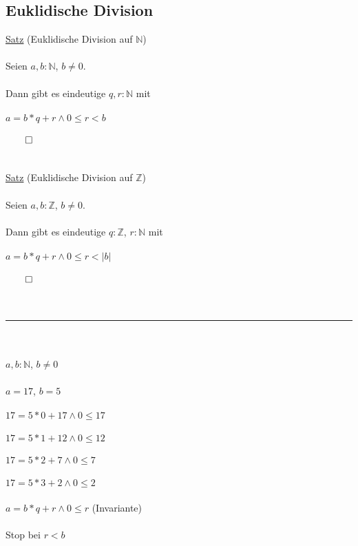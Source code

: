 \documentclass[18pt,a4paper]{article}
\begin{document}
\subsection{Euklidische Division}

\uline{Satz} (Euklidische Division auf $\mathbb{N}$)\\
\\
Seien $a,b : \mathbb{N} $, $ b\neq 0$.\\
\\
Dann gibt es eindeutige $q, r : \mathbb{N}$ mit\\
\\
$a = b*q + r \wedge 0\leqslant r < b$\\
\\
$\qed$\\
\\
\\
\uline{Satz} (Euklidische Division auf $\mathbb{Z}$)\\
\\
Seien $a,b : \mathbb{Z} $, $ b\neq 0$.\\
\\
Dann gibt es eindeutige $q : \mathbb{Z}$, $ r : \mathbb{N}$ mit\\
\\
$a = b*q + r \wedge 0\leqslant r < |b|$\\
\\
$\qed$\\
\\
\\
\rule{\textwidth}{0.4mm}\\
\\
$a,b : \mathbb{N}$, $b\neq 0$\\
\\
$a = 17$, $b = 5$\\
\\
$17 = 5*0 + 17 \wedge 0\leqslant 17$\\
\\
$17 = 5*1 + 12 \wedge 0\leqslant 12$\\
\\
$17 = 5*2 + 7 \wedge 0\leqslant 7$\\
\\
$17 = 5*3 + 2 \wedge 0\leqslant 2$\\
\\
$a = b * q + r \wedge 0\leqslant r$ (Invariante)\\
\\
Stop bei $r<b$\\
\\
\end{document}
